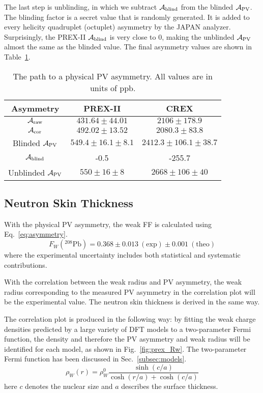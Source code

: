 The last step is unblinding, in which we subtract $\mathcal{A}_{\text{blind}}$ from the blinded
$\mathcal{A}_{\text{PV}}$. The blinding factor is a secret value that is randomly generated.
It is added to every helicity quadruplet (octuplet) asymmetry by the JAPAN analyzer.
Surprisingly, the PREX-II $\mathcal{A}_{\text{blind}}$ is very close to 0, making the unblinded
$\mathcal{A}_{\text{PV}}$ almost the same as the blinded value. The final asymmetry values are
shown in Table~\ref{tab:pcrex_final_number}.
\begin{table}[!h]
    \centering
    \begin{tabular}{c | c c}
	\hline
	Asymmetry   & PREX-II	& CREX	\\
	\hline
	$\mathcal{A}_{\text{raw}}$ & $431.64 \pm 44.01$    & $2106 \pm 178.9$	\\
	$\mathcal{A}_{\text{cor}}$ & $492.02 \pm 13.52$    & $2080.3 \pm 83.8$	\\
	Blinded $\mathcal{A}_{\text{PV}}$ & $549.4 \pm 16.1 \pm 8.1$    & $2412.3 \pm 106.1 \pm 38.7$	\\
	$\mathcal{A}_{\text{blind}}$	& -0.5	& -255.7    \\
	\hline
	Unblinded $\mathcal{A}_{\text{PV}}$	& $550 \pm 16 \pm 8$	& $2668 \pm 106 \pm 40$	\\
	\hline
    \end{tabular}
    \caption{The path to a physical PV asymmetry. All values are in units of ppb.}
    \label{tab:pcrex_final_number}
\end{table}

\subsection{Neutron Skin Thickness}
With the physical PV asymmetry, the weak FF is calculated using Eq.~\ref{eq:asymmetry}.
\begin{equation}
    F_W ({}^{208}\text{Pb}) = 0.368  \pm 0.013 \ (\text{exp}) \pm 0.001 \ (\text{theo})
\end{equation}
where the experimental uncertainty includes both statistical and systematic contributions.

With the correlation between the weak radius and PV asymmetry,
the weak radius corresponding to the measured PV asymmetry in the correlation 
plot will be the experimental value.
The neutron skin thickness is derived in the same way.

The correlation plot is produced in the following way:
by fitting the weak charge densities predicted by a large variety of DFT models
to a two-parameter Fermi function, the density and therefore the PV asymmetry and
weak radius will be identified for each model, as shown in Fig.~\ref{fig:prex_Rw}.
The two-parameter Fermi function has been discussed in Sec.~\ref{subsec:models}.
\begin{equation*}
    \rho_W(r) = \rho_W^0 \frac{\sinh(c/a)}{\cosh(r/a) + \cosh(c/a)}
\end{equation*}
here $c$ denotes the nuclear size and $a$ describes the surface thickness. 

